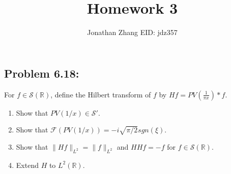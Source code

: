 \documentclass[letterpaper,twoside,11pt]{article}
\theoremstyle{mystyle}
\newcommand{\R}{{\mathbb R}}
\newcommand{\sch}{\mathcal S}
\begin{document}
\title{\vspace{-2\baselineskip} 
Homework 3
}
\author{Jonathan Zhang \qquad EID: { jdz357} }
\date{}
\maketitle


\subsection*{Problem 6.18:}
 For $f\in \mathcal S (\R)$, define the Hilbert transform of $f$ by $Hf = PV\left( \frac{1}{\pi x} \right) \ast f$.
\begin{enumerate}
  \item Show that $PV(1/x)\in \sch '$.
  \item Show that $\mathcal F \left( PV\left( 1/x \right) \right) = -i\sqrt{\pi/2} sgn\left( \xi \right)$. 
  \item Show that $\|Hf\|_{L^2} = \|f\|_{L^2}$ and $HHf = -f$ for $f \in \sch \left( \R \right)$.  
  \item Extend $H$ to $L^2\left( \R \right)$. 
\end{enumerate}
\end{document}

